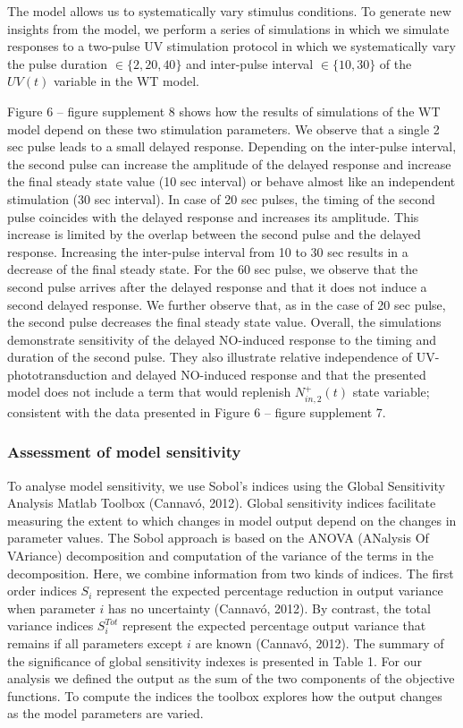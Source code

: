 \documentclass[
  11pt,
  letterpaper,
  DIV=11,
  numbers=noendperiod]{scrartcl}
\begin{document}
The model allows us to systematically vary stimulus conditions. To
generate new insights from the model, we perform a series of simulations
in which we simulate responses to a two-pulse UV stimulation protocol in
which we systematically vary the pulse duration \(\in \{2,20,40\}\) and
inter-pulse interval \(\in \{10, 30\}\) of the \(UV(t)\) variable in the
WT model.

Figure 6 -- figure supplement 8 shows how the results of simulations of
the WT model depend on these two stimulation parameters. We observe that
a single 2 sec pulse leads to a small delayed response. Depending on the
inter-pulse interval, the second pulse can increase the amplitude of the
delayed response and increase the final steady state value (10 sec
interval) or behave almost like an independent stimulation (30 sec
interval). In case of 20 sec pulses, the timing of the second pulse
coincides with the delayed response and increases its amplitude. This
increase is limited by the overlap between the second pulse and the
delayed response. Increasing the inter-pulse interval from 10 to 30 sec
results in a decrease of the final steady state. For the 60 sec pulse,
we observe that the second pulse arrives after the delayed response and
that it does not induce a second delayed response. We further observe
that, as in the case of 20 sec pulse, the second pulse decreases the
final steady state value. Overall, the simulations demonstrate
sensitivity of the delayed NO-induced response to the timing and
duration of the second pulse. They also illustrate relative independence
of UV-phototransduction and delayed NO-induced response and that the
presented model does not include a term that would replenish
\(N_{in,2}^{+}(t)\) state variable; consistent with the data presented
in Figure 6 -- figure supplement 7.

\subsubsection{Assessment of model
sensitivity}\label{assessment-of-model-sensitivity}

To analyse model sensitivity, we use Sobol's indices using the Global
Sensitivity Analysis Matlab Toolbox (Cannavó, 2012). Global sensitivity
indices facilitate measuring the extent to which changes in model output
depend on the changes in parameter values. The Sobol approach is based
on the ANOVA (ANalysis Of VAriance) decomposition and computation of the
variance of the terms in the decomposition. Here, we combine information
from two kinds of indices. The first order indices \(S_i\) represent the
expected percentage reduction in output variance when parameter \(i\)
has no uncertainty (Cannavó, 2012). By contrast, the total variance
indices \(S^{Tot}_i\) represent the expected percentage output variance
that remains if all parameters except \(i\) are known (Cannavó, 2012).
The summary of the significance of global sensitivity indexes is
presented in Table 1. For our analysis we defined the output as the sum
of the two components of the objective functions. To compute the indices
the toolbox explores how the output changes as the model parameters are
varied.
\end{document}
